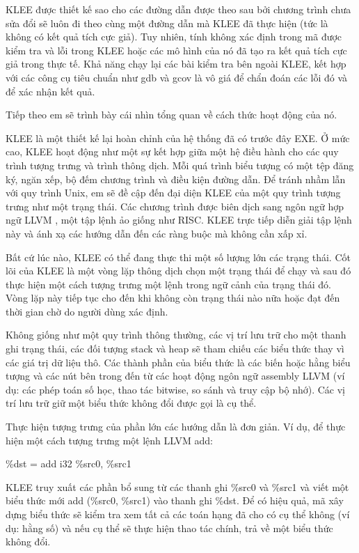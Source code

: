 \documentclass[12pt,a4paper]{report}
\begin{document}
\indent KLEE được thiết kế sao cho các đường dẫn được theo sau bởi chương trình chưa sửa đổi sẽ luôn đi theo cùng một đường dẫn mà KLEE đã thực hiện (tức là không có kết quả tích cực giả). Tuy nhiên, tính không xác định trong mã được kiểm tra và lỗi trong KLEE hoặc các mô hình của nó đã tạo ra kết quả tích cực giả trong thực tế. Khả năng chạy lại các bài kiểm tra bên ngoài KLEE, kết hợp với các công cụ tiêu chuẩn như gdb và gcov là vô giá để chẩn đoán các lỗi đó và để xác nhận kết quả.

\indent Tiếp theo em sẽ trình bày cái nhìn tổng quan về cách thức hoạt động của nó.

\indent KLEE là một thiết kế lại hoàn chỉnh của hệ thống đã có trước đây EXE. Ở mức cao, KLEE hoạt động như một sự kết hợp giữa một hệ điều hành cho các quy trình tượng trưng và trình thông dịch. Mỗi quá trình biểu tượng có một tệp đăng ký, ngăn xếp, bộ đếm chương trình và điều kiện đường dẫn. Để tránh nhầm lẫn với quy trình Unix, em sẽ đề cập đến đại diện KLEE của một quy trình tượng trưng như một trạng thái. Các chương trình được biên dịch sang ngôn ngữ hợp ngữ LLVM \cite{lattner2004llvm}, một tập lệnh ảo giống như RISC. KLEE trực tiếp diễn giải tập lệnh này và ánh xạ các hướng dẫn đến các ràng buộc mà không cần xấp xỉ.

\indent Bất cứ lúc nào, KLEE có thể đang thực thi một số lượng lớn các trạng thái. Cốt lõi của KLEE là một vòng lặp thông dịch chọn một trạng thái để chạy và sau đó thực hiện một cách tượng trưng một lệnh trong ngữ cảnh của trạng thái đó. Vòng lặp này tiếp tục cho đến khi không còn trạng thái nào nữa hoặc đạt đến thời gian chờ do người dùng xác định.

\indent Không giống như một quy trình thông thường, các vị trí lưu trữ cho một thanh ghi trạng thái, các đối tượng stack và heap sẽ tham chiếu các biểu thức  thay vì các giá trị dữ liệu thô. Các thành phần của biểu thức là các biến hoặc hằng biểu tượng và các nút bên trong đến từ các hoạt động ngôn ngữ assembly LLVM (ví dụ: các phép toán số học, thao tác bitwise, so sánh và truy cập bộ nhớ). Các vị trí lưu trữ giữ một biểu thức không đổi được gọi là cụ thể.

\indent Thực hiện tượng trưng của phần lớn các hướng dẫn là đơn giản. Ví dụ, để thực hiện một cách tượng trưng một lệnh LLVM add:

\begin{center}
\%dst = add i32 \%src0, \%src1
\end{center}

\indent KLEE truy xuất các phần bổ sung từ các thanh ghi \%src0 và \%src1 và viết một biểu thức mới add (\%src0, \%src1) vào thanh ghi \%dst. Để có hiệu quả, mã xây dựng biểu thức sẽ kiểm tra xem tất cả các toán hạng đã cho có cụ thể không (ví dụ: hằng số) và nếu cụ thể sẽ thực hiện thao tác chính, trả về một biểu thức không đổi.
\end{document}
